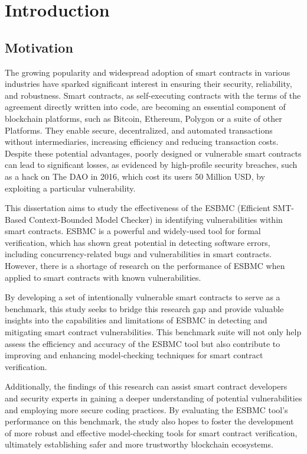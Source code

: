 \chapter{Introduction}
\label{cha:intro}


\section{Motivation}

The growing popularity and widespread adoption of smart contracts in various industries have sparked significant interest in ensuring their security, reliability, and robustness. Smart contracts, as self-executing contracts with the terms of the agreement directly written into code, are becoming an essential component of blockchain platforms, such as Bitcoin, Ethereum, Polygon or a suite of other Platforms. They enable secure, decentralized, and automated transactions without intermediaries, increasing efficiency and reducing transaction costs. Despite these potential advantages, poorly designed or vulnerable smart contracts can lead to significant losses, as evidenced by high-profile security breaches, such as a hack on The DAO in 2016, which cost its users 50 Million USD, by exploiting a particular vulnerability.

This dissertation aims to study the effectiveness of the ESBMC (Efficient SMT-Based Context-Bounded Model Checker) in identifying vulnerabilities within smart contracts. ESBMC is a powerful and widely-used tool for formal verification, which has shown great potential in detecting software errors, including concurrency-related bugs and vulnerabilities in smart contracts. However, there is a shortage of research on the performance of ESBMC when applied to smart contracts with known vulnerabilities.

By developing a set of intentionally vulnerable smart contracts to serve as a benchmark, this study seeks to bridge this research gap and provide valuable insights into the capabilities and limitations of ESBMC in detecting and mitigating smart contract vulnerabilities. This benchmark suite will not only help assess the efficiency and accuracy of the ESBMC tool but also contribute to improving and enhancing model-checking techniques for smart contract verification.

Additionally, the findings of this research can assist smart contract developers and security experts in gaining a deeper understanding of potential vulnerabilities and employing more secure coding practices. By evaluating the ESBMC tool's performance on this benchmark, the study also hopes to foster the development of more robust and effective model-checking tools for smart contract verification, ultimately establishing safer and more trustworthy blockchain ecosystems.

